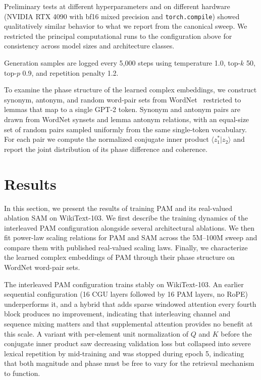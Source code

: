 \documentclass[aps,prl,twocolumn,superscriptaddress,amsmath,amssymb]{revtex4-2}
\begin{document}
Preliminary tests at different hyperparameters and on different hardware (NVIDIA RTX 4090 with bf16 mixed precision and \texttt{torch.compile}) showed qualitatively similar behavior to what we report from the canonical sweep. We restricted the principal computational runs to the configuration above for consistency across model sizes and architecture classes.

Generation samples are logged every 5,000 steps using temperature 1.0, top-$k$ 50, top-$p$ 0.9, and repetition penalty 1.2.

To examine the phase structure of the learned complex embeddings, we construct synonym, antonym, and random word-pair sets from WordNet~\cite{miller1995wordnet,fellbaum1998wordnet} restricted to lemmas that map to a single GPT-2 token. Synonym and antonym pairs are drawn from WordNet synsets and lemma antonym relations, with an equal-size set of random pairs sampled uniformly from the same single-token vocabulary. For each pair we compute the normalized conjugate inner product $\langle z_1^* | z_2 \rangle$ and report the joint distribution of its phase difference and coherence.

\section{Results}
\label{sec:results}

\label{sec:main-result}

In this section, we present the results of training PAM and its real-valued ablation SAM on WikiText-103. We first describe the training dynamics of the interleaved PAM configuration alongside several architectural ablations. We then fit power-law scaling relations for PAM and SAM across the 5M--100M sweep and compare them with published real-valued scaling laws. Finally, we characterize the learned complex embeddings of PAM through their phase structure on WordNet word-pair sets.

The interleaved PAM configuration trains stably on WikiText-103. An earlier sequential configuration (16 CGU layers followed by 16 PAM layers, no RoPE) underperforms it, and a hybrid that adds sparse windowed attention every fourth block produces no improvement, indicating that interleaving channel and sequence mixing matters and that supplemental attention provides no benefit at this scale. A variant with per-element unit normalization of $Q$ and $K$ before the conjugate inner product saw decreasing validation loss but collapsed into severe lexical repetition by mid-training and was stopped during epoch 5, indicating that both magnitude and phase must be free to vary for the retrieval mechanism to function.
\end{document}
